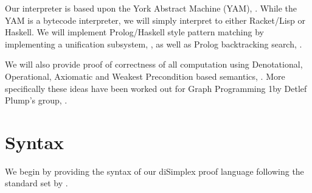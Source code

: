 Our interpreter is based upon the York Abstract Machine (YAM),
\cite{manningPlump2008yorkMachine}. While the YAM is a bytecode interpreter, we
will simply interpret to either Racket/Lisp or Haskell. We will implement
Prolog/Haskell style pattern matching by implementing a unification subsystem,
\cite[section
30.5.1]{krishnamurthi2007programmingLanguagesApplicationInterpretation}, as well
as Prolog backtracking search,
\cite[34.1.1]{krishnamurthi2007programmingLanguagesApplicationInterpretation}.

We will also provide proof of correctness of all computation using Denotational,
Operational, Axiomatic and Weakest Precondition based semantics,
\cite{gunter1992semainticProgrammingLanguages,
winskel1993formalSemanticsProgrammingLanguages, gries1981scienceProgramming,
scott1970theoryComputation, plotkin1981structuralOperationalSemantics,
hoare1969axiomaticSemantics, dijkstra1975guardedCommandsFormalDerivation}. More
specifically these ideas have been worked out for Graph Programming 1by Detlef
Plump's group, \cite{steinert2007graphProgramming,
plumpSteinert2010semanticsGraphProgramming, poskittPlump2010hoareLogic,
poskittPlump2010hoareCalculus}.

\section{Syntax}

We begin by providing the syntax of our diSimplex proof language following the
standard set by \cite{friedmanWand2008essentialsProgrammingLanguages}.

\begin{bnf*}
\end{bnf*}










